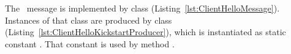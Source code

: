 \begin{tcolorbox}
The \ClientHello\ message is implemented by class 
(Listing~\ref{lst:ClientHelloMessage}).
Instances of that class are produced by class 
(Listing~\ref{lst:ClientHelloKickstartProducer}), %
which is instantiated as static constant . That constant is used by method 
. 
\begin{comment}
Class \code{ClientHello} is reliant on classes 
\code{SSLExtensions} %
and \code{SSLExtension} (Appendix~\ref{sec:extensions}) 
for extensions.
\end{comment}
\end{tcolorbox}

\begin{comment}
\footnotetext{Class \code{ClientHello.ClientHelloKickstartProducer} implements
  interface \code{SSLProducer}, which defines a single method --
    namely, \code{byte[] produce(ConnectionContext context) throws IOException}
  -- common to \ClientHello\ messages originating from the client, %
  \NewSessionTicket\ messages originating from the server, and 
  \KeyUpdate\ messages originating from either endpoint. Parameter \code{context} defines the active context and may 
  be cast to children \code{ClientHandshakeContext} and \code{ServerHandshakeContext}, 
  as seen in Line~398 of Listing~\ref{lst:ClientHelloKickstartProducer}, for instance.
  That context is updated during production of \ClientHello, \KeyUpdate\
  and \NewSessionTicket\ messages.
  \textcolor{red}{Are these details worth knowing?}
}
\end{comment}

